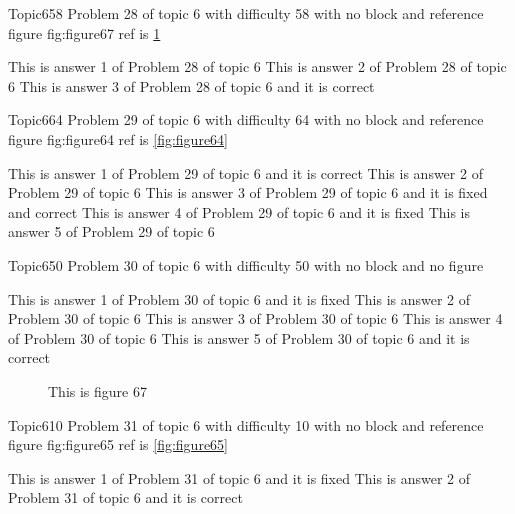 \documentclass[master]{exam}
\begin{document}
\begin{problem}{Topic6}{58}
	Problem 28 of topic 6 with difficulty 58 with no block and reference figure fig:figure67 ref is \ref{fig:figure67}
	\begin{answers}
		\answer This is answer 1 of Problem 28 of topic 6 
		\answer This is answer 2 of Problem 28 of topic 6 
		\answer[correct] This is answer 3 of Problem 28 of topic 6 and it is correct
	\end{answers}
\end{problem}

\begin{problem}{Topic6}{64}
	Problem 29 of topic 6 with difficulty 64 with no block and reference figure fig:figure64 ref is \ref{fig:figure64}
	\begin{answers}
		\answer[correct] This is answer 1 of Problem 29 of topic 6 and it is correct
		\answer This is answer 2 of Problem 29 of topic 6 
		 This is answer 3 of Problem 29 of topic 6 and it is fixed and correct
		\answer[fixed] This is answer 4 of Problem 29 of topic 6 and it is fixed
		\answer This is answer 5 of Problem 29 of topic 6 
	\end{answers}
\end{problem}

\begin{problem}{Topic6}{50}
	Problem 30 of topic 6 with difficulty 50 with no block and no figure
	\begin{answers}
		\answer[fixed] This is answer 1 of Problem 30 of topic 6 and it is fixed
		\answer This is answer 2 of Problem 30 of topic 6 
		\answer This is answer 3 of Problem 30 of topic 6 
		\answer This is answer 4 of Problem 30 of topic 6 
		\answer[correct] This is answer 5 of Problem 30 of topic 6 and it is correct
	\end{answers}
\end{problem}



\begin{figure}
	\begin{center}
		This is figure 67 
		\label{fig:figure67}
	\end{center}
\end{figure}

\begin{problem}{Topic6}{10}
	Problem 31 of topic 6 with difficulty 10 with no block and reference figure fig:figure65 ref is \ref{fig:figure65}
	\begin{answers}
		\answer[fixed] This is answer 1 of Problem 31 of topic 6 and it is fixed
		\answer[correct] This is answer 2 of Problem 31 of topic 6 and it is correct
	\end{answers}
\end{problem}
\end{document}

